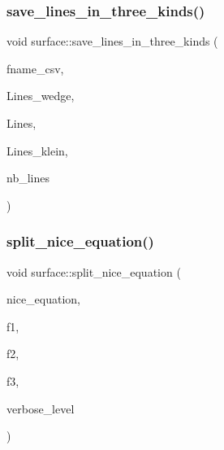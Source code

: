 \mbox{\label{classsurface_ad8794c6be4f15f91112cd9b716357400}} 
\subsubsection{\texorpdfstring{save\+\_\+lines\+\_\+in\+\_\+three\+\_\+kinds()}{save\_lines\_in\_three\_kinds()}}
{\footnotesize\ttfamily void surface\+::save\+\_\+lines\+\_\+in\+\_\+three\+\_\+kinds (\begin{DoxyParamCaption}\item[{const \mbox{\hyperlink{galois_8h_ab6cc7b4aeb6ea31aba2b3fbfc83ff5e6}{B\+Y\+TE}} $\ast$}]{fname\+\_\+csv,  }\item[{\mbox{\hyperlink{galois_8h_a09fddde158a3a20bd2dcadb609de11dc}{I\+NT}} $\ast$}]{Lines\+\_\+wedge,  }\item[{\mbox{\hyperlink{galois_8h_a09fddde158a3a20bd2dcadb609de11dc}{I\+NT}} $\ast$}]{Lines,  }\item[{\mbox{\hyperlink{galois_8h_a09fddde158a3a20bd2dcadb609de11dc}{I\+NT}} $\ast$}]{Lines\+\_\+klein,  }\item[{\mbox{\hyperlink{galois_8h_a09fddde158a3a20bd2dcadb609de11dc}{I\+NT}}}]{nb\+\_\+lines }\end{DoxyParamCaption})}

\mbox{\label{classsurface_a5d670fff3513ca4261aeb0fe95b6771c}} 
\subsubsection{\texorpdfstring{split\+\_\+nice\+\_\+equation()}{split\_nice\_equation()}}
{\footnotesize\ttfamily void surface\+::split\+\_\+nice\+\_\+equation (\begin{DoxyParamCaption}\item[{\mbox{\hyperlink{galois_8h_a09fddde158a3a20bd2dcadb609de11dc}{I\+NT}} $\ast$}]{nice\+\_\+equation,  }\item[{\mbox{\hyperlink{galois_8h_a09fddde158a3a20bd2dcadb609de11dc}{I\+NT}} $\ast$\&}]{f1,  }\item[{\mbox{\hyperlink{galois_8h_a09fddde158a3a20bd2dcadb609de11dc}{I\+NT}} $\ast$\&}]{f2,  }\item[{\mbox{\hyperlink{galois_8h_a09fddde158a3a20bd2dcadb609de11dc}{I\+NT}} $\ast$\&}]{f3,  }\item[{\mbox{\hyperlink{galois_8h_a09fddde158a3a20bd2dcadb609de11dc}{I\+NT}}}]{verbose\+\_\+level }\end{DoxyParamCaption})}

